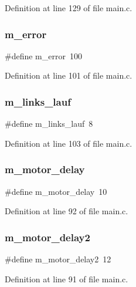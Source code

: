 Definition at line 129 of file main.\+c.

\mbox{\label{main_8c_a7fd0a84666c494a9a7fdeb1a078b3bc3}} 
\subsubsection{m\+\_\+error}
{\footnotesize\ttfamily \#define m\+\_\+error~100}



Definition at line 101 of file main.\+c.

\mbox{\label{main_8c_afeb664643f2fd19bb6cf60d5fe8313ea}} 
\subsubsection{m\+\_\+links\+\_\+lauf}
{\footnotesize\ttfamily \#define m\+\_\+links\+\_\+lauf~8}



Definition at line 103 of file main.\+c.

\mbox{\label{main_8c_a34aca814f8990bae055e4c61a393db23}} 
\subsubsection{m\+\_\+motor\+\_\+delay}
{\footnotesize\ttfamily \#define m\+\_\+motor\+\_\+delay~10}



Definition at line 92 of file main.\+c.

\mbox{\label{main_8c_a7a71d2234d5379caff097a130895897c}} 
\subsubsection{m\+\_\+motor\+\_\+delay2}
{\footnotesize\ttfamily \#define m\+\_\+motor\+\_\+delay2~12}



Definition at line 91 of file main.\+c.

\mbox{\label{main_8c_a8d33e56bf4980adb537abfb23ba56f75}} 
